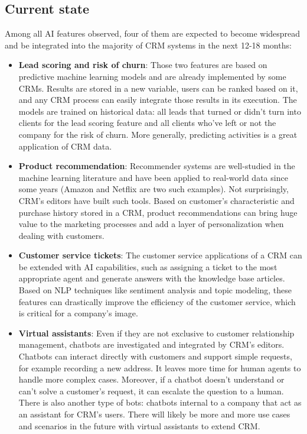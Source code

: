 \subsection{Current state}
Among all AI features observed, four of them are expected to become widespread and be integrated into the majority of CRM systems in the next 12-18 months:

\begin{itemize}
    \item \textbf{Lead scoring and risk of churn}: Those two features are based on predictive machine learning models and are already implemented by some CRMs. Results are stored in a new variable, users can be ranked based on it, and any CRM process can easily integrate those results in its execution. The models are trained on historical data: all leads that turned or didn't turn into clients for the lead scoring feature and all clients who've left or not the company for the risk of churn. More generally, predicting activities is a great application of CRM data.
    \item \textbf{Product recommendation}: Recommender systems are well-studied in the machine learning literature and have been applied to real-world data since some years (Amazon and Netflix are two such examples). Not surprisingly, CRM's editors have built such tools. Based on customer's characteristic and purchase history stored in a CRM, product recommendations can bring huge value to the marketing processes and add a layer of personalization when dealing with customers.
    \item \textbf{Customer service tickets}: The customer service applications of a CRM can be extended with AI capabilities, such as assigning a ticket to the most appropriate agent and generate answers with the knowledge base articles. Based on NLP techniques like sentiment analysis and topic modeling, these features can drastically improve the efficiency of the customer service, which is critical for a company's image.
    \item \textbf{Virtual assistants}: Even if they are not exclusive to customer relationship management, chatbots are investigated and integrated by CRM's editors. Chatbots can interact directly with customers and support simple requests, for example recording a new address. It leaves more time for human agents to handle more complex cases. Moreover, if a chatbot doesn't understand or can't solve a customer's request, it can escalate the question to a human. There is also another type of bots: chatbots internal to a company that act as an assistant for CRM's users. There will likely be more and more use cases and scenarios in the future with virtual assistants to extend CRM.
\end{itemize}

